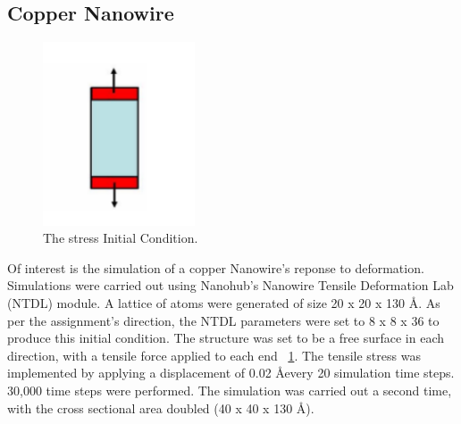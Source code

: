 \documentclass{report}
\begin{document}
        \subsection{Copper Nanowire}
        \begin{figure}[!htb]
            \label{fig:applied-stress-partA}
            \centering
            \includegraphics[width=0.4\textwidth]{applied-stress-partA.png}
            \caption{The stress Initial Condition.}
        \end{figure}
        Of interest is the simulation of a copper Nanowire's reponse to deformation.  Simulations were carried out using Nanohub's Nanowire Tensile Deformation Lab (NTDL) module.  A lattice of atoms were generated of size 20 x 20 x 130 \AA. As per the assignment's direction, the NTDL parameters were set to 8 x 8 x 36 to produce this initial condition.  The structure was set to be a free surface in each direction, with a tensile force applied to each end ~\ref{fig:applied-stress-partA}.  The tensile stress was implemented by applying a displacement of 0.02 \AA  every 20 simulation time steps. 30,000 time steps were performed.  The simulation was carried out a second time, with the cross sectional area doubled (40 x 40 x 130 \AA).
\end{document}
